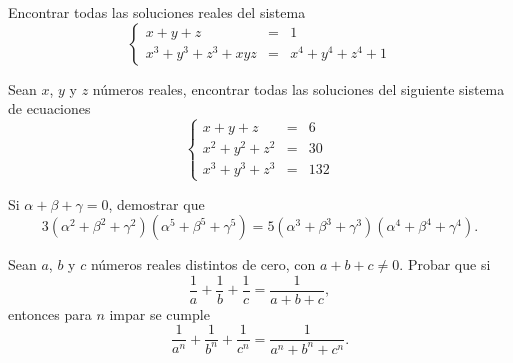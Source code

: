 \begin{section-problem}
    Encontrar todas las soluciones reales del sistema
    \[
        \left\{
        \begin{array}{rcl}
            x + y + z & =& 1\\
            x^3 + y^3 + z^3 + xyz & =& x^4 + y^4 + z^4 + 1
        \end{array}
        \right.
    \]
\end{section-problem}

\begin{section-problem}
    Sean $x$, $y$ y $z$ números reales, encontrar todas las soluciones del siguiente sistema de ecuaciones
    \[
        \left\{
        \begin{array}{rcl}
            x + y + z & =& 6\\
            x^2 + y^2 + z^2 & =& 30\\
            x^3 + y^3 + z^3 & =& 132
        \end{array}
        \right.
    \]
\end{section-problem}

\begin{section-problem}
    Si $\alpha + \beta + \gamma = 0$, demostrar que
    \[3 (\alpha^2 + \beta^2 + \gamma^2) (\alpha^5 + \beta^5 + \gamma^5) = 5 (\alpha^3 + \beta^3 + \gamma^3) (\alpha^4 + \beta^4 + \gamma^4).\]
\end{section-problem}

\begin{section-problem}
    Sean $a$, $b$ y $c$ números reales distintos de cero, con $a + b + c \neq 0$.
    Probar que si
    \[\frac{1}{a} + \frac{1}{b} + \frac{1}{c} = \frac{1}{a + b + c},\]
    entonces para $n$ impar se cumple
    \[\frac{1}{a^n} + \frac{1}{b^n} + \frac{1}{c^n} = \frac{1}{a^n + b^n + c^n}.\]
\end{section-problem}